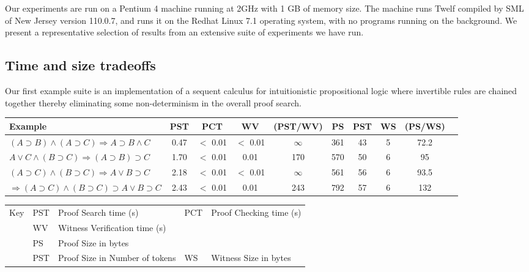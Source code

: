 \documentclass{llncs}
\begin{document}
Our experiments are run on a Pentium 4 machine running at 2GHz with 1
GB of memory size.  The machine runs Twelf compiled by SML of New
Jersey version 110.0.7, and runs it on the Redhat Linux 7.1 operating
system, with no programs running on the background. We present a
representative selection of results from an extensive suite of
experiments we have run.
   

\subsection{Time and size tradeoffs}

Our first example suite is an implementation of a sequent calculus for
intuitionistic propositional logic where invertible rules are chained
together thereby eliminating some non-determinism in the overall proof
search.

\begin{table*}[htbp]
\begin{center}
\begin{small}
\begin{tabular}{|l|c|c|c|c|c|c|c|c|c|}
\hline
Example & PST & PCT & WV & (PST/WV) & PS & PST & WS & (PS/WS)\\
\hline
$(A\supset B)\wedge (A\supset C)\Rightarrow A\supset B\wedge C$
&       0.47 
&     $<$ 0.01
&     $<$  0.01 
& $\infty$
&       361 
&       43 
&       5 
&       72.2\\
$A\vee C\wedge (B\supset C)\Rightarrow (A\supset B)\supset C$
&       1.70 
&      $<$ 0.01
&       0.01
&       170 
&       570 
&       50 
&       6 
&       95\\
$(A\supset C)\wedge (B\supset C)\Rightarrow A\vee B\supset C$
&       2.18 
&      $<$ 0.01
&      $<$ 0.01
&      $\infty$ 
&       561 
&       56 
&       6 
&       93.5\\
$\Rightarrow (A\supset C)\wedge (B\supset C)\supset A\vee B\supset C$
&       2.43 
&      $<$ 0.01
&       0.01
&       243 
&       792 
&       57 
&       6 
&       132\\
\hline
\end{tabular}
\begin{tabular}{ll@{=}ll@{=}l}
Key & PST & Proof Search time (s)
&PCT & Proof Checking time (s)\\ 
&WV & Witness Verification time (s)\\ 
&PS & Proof Size in bytes\\
&PST & Proof Size in Number of tokens 
&WS & Witness Size in bytes\\
\end{tabular} 
\end{small}
\end{center}
\caption{\label{tab:seqtimes}
Sequent Calculus: Times with Caching of User-Selected Predicates}
\end{table*}
\end{document}
